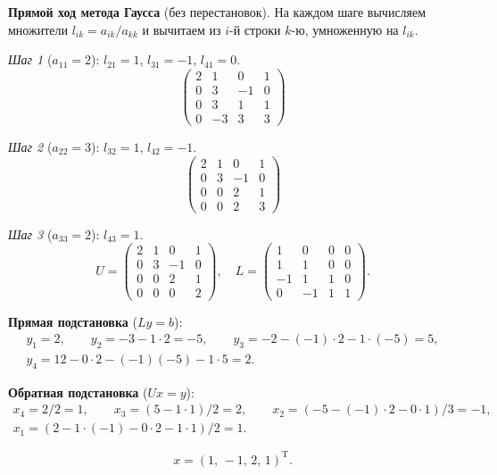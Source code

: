 \documentclass{article}
\begin{document}
\textbf{Прямой ход метода Гаусса} (без перестановок). На каждом шаге вычисляем множители $l_{ik}=a_{ik}/a_{kk}$ и вычитаем из $i$-й строки $k$-ю, умноженную на $l_{ik}$.

\textit{Шаг 1} ($a_{11}=2$): $l_{21}=1$, $l_{31}=-1$, $l_{41}=0$.
$$\begin{pmatrix} 2 & 1 & 0 & 1 \\ 0 & 3 & -1 & 0 \\ 0 & 3 & 1 & 1 \\ 0 & -3 & 3 & 3 \end{pmatrix}$$

\textit{Шаг 2} ($a_{22}=3$): $l_{32}=1$, $l_{42}=-1$.
$$\begin{pmatrix} 2 & 1 & 0 & 1 \\ 0 & 3 & -1 & 0 \\ 0 & 0 & 2 & 1 \\ 0 & 0 & 2 & 3 \end{pmatrix}$$

\textit{Шаг 3} ($a_{33}=2$): $l_{43}=1$.
$$U = \begin{pmatrix} 2 & 1 & 0 & 1 \\ 0 & 3 & -1 & 0 \\ 0 & 0 & 2 & 1 \\ 0 & 0 & 0 & 2 \end{pmatrix}, \quad L = \begin{pmatrix} 1 & 0 & 0 & 0 \\ 1 & 1 & 0 & 0 \\ -1 & 1 & 1 & 0 \\ 0 & -1 & 1 & 1 \end{pmatrix}.$$

\textbf{Прямая подстановка} ($Ly = b$):
$$\begin{aligned}
y_1 = 2, \qquad
y_2 = -3 - 1\cdot 2 = -5, \qquad
y_3 = -2 - (-1)\cdot 2 - 1\cdot(-5) = 5, \\
y_4 = 12 - 0\cdot 2 - (-1)(-5) - 1\cdot 5 = 2.
\end{aligned}$$

\textbf{Обратная подстановка} ($Ux = y$):
$$\begin{aligned}
x_4 = 2/2 = 1, \qquad
x_3 = (5 - 1\cdot 1)/2 = 2, \qquad
x_2 = (-5 - (-1)\cdot 2 - 0\cdot 1)/3 = -1, \\
x_1 = (2 - 1\cdot(-1) - 0\cdot 2 - 1\cdot 1)/2 = 1.
\end{aligned}$$

$$\boxed{x = (1,\,-1,\,2,\,1)^\text{T}.}$$
\end{document}
